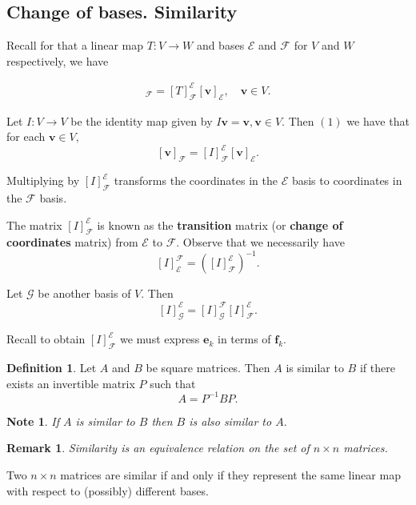 \documentclass[12pt, a4paper]{article}
\newtheorem*{remark}{Remark}
\newtheorem*{note}{Note}
\theoremstyle{definition}
\newtheorem{definition}{Definition}[section]
\theoremstyle{plain}
\newcommand{\vect}[1]{\mathbf{#1}}
\newcommand{\Cal}[1]{\mathcal{#1}}
\begin{document}
\subsection{Change of bases. Similarity}

Recall for that a linear map $T:V\rightarrow W$ and bases $\Cal{E}$ and $\Cal{F}$ for $V$ and $W$ respectively, we have 

\begin{align}
[T\vect{v}]_{\Cal{F}}=[T]_{\Cal{F}}^{\Cal{E}}[\vect{v}]_{\Cal{E}}, \quad \vect{v} \in V.
\end{align}

Let $I:V\rightarrow V$ be the identity map given by $I\vect{v}=\vect{v}, \vect{v} \in V.$ Then $(1)$ we have that for each $\vect{v} \in V,$ $$[\vect{v}]_{\Cal{F}}=[I]_{\Cal{F}}^{\Cal{E}}[\vect{v}]_{\Cal{E}}.$$

\begin{tcolorbox}
Multiplying by $[I]_{\Cal{F}}^{\Cal{E}}$ transforms the coordinates in the $\Cal{E}$ basis to coordinates in the $\Cal{F}$ basis.\end{tcolorbox}

The matrix $[I]_{\Cal{F}}^{\Cal{E}}$ is known as the \textbf{transition} matrix (or \textbf{change of coordinates} matrix) from $\Cal{E}$ to $\Cal{F}.$ Observe that we necessarily have $$[I]_{\Cal{E}}^{\Cal{F}}=([I]_{\Cal{F}}^{\Cal{E}})^{-1}.$$

Let $\Cal{G}$ be another basis of $V.$ Then $$[I]_{\Cal{G}}^{\Cal{E}}=[I]_{\Cal{G}}^{\Cal{F}}[I]_{\Cal{F}}^{\Cal{E}}.$$

Recall to obtain $[I]_{\Cal{F}}^{\Cal{E}}$ we must express $\vect{e}_k$ in terms of $\vect{f}_k.$ 

\begin{definition} Let $A$ and $B$ be square matrices. Then $A$ is similar to $B$ if there exists an invertible matrix $P$ such that $$A=P^{-1}BP.$$ \end{definition}

\begin{note}
If $A$ is similar to $B$ then $B$ is also similar to $A.$
\end{note}

\begin{remark}
Similarity is an equivalence relation on the set of $n\times n$ matrices.
\end{remark}

\begin{tcolorbox}
Two $n\times n$ matrices are similar if and only if they represent the same linear map with respect to (possibly) different bases.
\end{tcolorbox}
\end{document}
